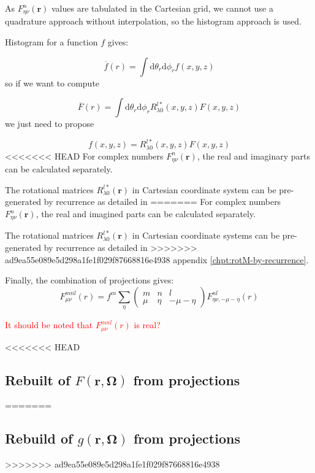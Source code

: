 As $F_{\eta\nu}^{n}(\mathbf{r})$ values are tabulated in the Cartesian
grid, we cannot use a quadrature approach without interpolation, so
the histogram approach is used.

Histogram for a function $f$ gives:

\begin{equation}
\overline{f}(r)=\int\mathrm{d}\theta_{r}\mathrm{d}\phi_{r}f(x,y,z)
\end{equation}
so if we want to compute

\begin{equation}
\overline{F}(r)=\int\mathrm{d}\theta_{r}\mathrm{d}\phi_{r}R_{\lambda0}^{l*}(x,y,z)F(x,y,z)
\end{equation}
we just need to propose 

\begin{equation}
f(x,y,z)=R_{\lambda0}^{l*}(x,y,z)F(x,y,z)
\end{equation}
<<<<<<< HEAD
For complex numbers $F_{\eta\nu}^{n}(\mathbf{r})$, the real and imaginary
parts can be calculated separately.

The rotational matrices $R_{\lambda0}^{l*}(\mathbf{r})$ in Cartesian
coordinate system can be pre-generated by recurrence as detailed in
=======
For complex numbers $F_{\eta\nu}^{n}(\mathbf{r})$, the real and imagined
parts can be calculated separately.

The rotational matrices $R_{\lambda0}^{l*}(\mathbf{r})$ in Cartesian
coordinate systems can be pre-generated by recurrence as detailed in
>>>>>>> ad9ea55e089e5d298a1fe1f029f87668816e4938
appendix \ref{chpt:rotM-by-recurrence}. 

Finally, the combination of projections gives:
\begin{equation}
F_{\mu\nu}^{mnl}(r)=f^{m}\sum_{\eta}\left(\begin{array}{ccc}
m & n & l\\
\mu & \eta & -\mu-\eta
\end{array}\right)F_{\eta\nu,-\mu-\eta}^{nl}(r)
\end{equation}


\textcolor{red}{It should be noted that $F_{\mu\nu}^{mnl}(r)$ is
real?}


<<<<<<< HEAD
\subsection{Rebuilt of $F(\mathbf{r},\mathbf{\Omega})$ from projections}
=======
\subsection{Rebuild of $g(\mathbf{r},\mathbf{\Omega})$ from projections}
>>>>>>> ad9ea55e089e5d298a1fe1f029f87668816e4938

